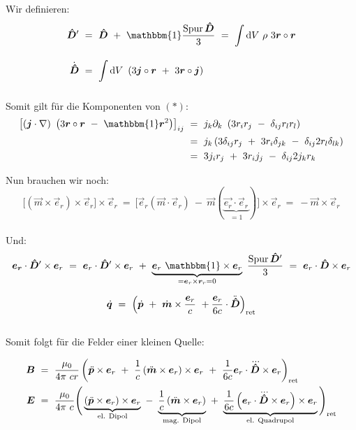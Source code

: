 \newpage
Wir definieren:
\begin{align*}
\tens{D}'  \ &= \ \tens{D} \ + \ \mathbbm{1}\frac{\operatorname{Spur} \tens{D}}{3}  \ = \  \Int{}{}{V}\rho \ 3 \vec{r}\circ\vec{r}\\
\dot{\tens{D}} \ &= \ \Int{}{}{V}\left(3\vec{j}\circ\vec{r} \ + \ 3 \vec{r}\circ\vec{j}\right)
\end{align*}

Somit gilt für die Komponenten von $(*)$:\\

\begin{align*}
\left[\left(\vec{j}\cdot\nabla\right) \ \left(3\vec{r}\circ\vec{r} \ - \ \mathbbm{1} \vec{r}^2\right)\right]_{ij}  \ &= \ j_k \partial_k\ \left(3 r_i r_j \ - \ \delta_{ij} r_l r_l\right)\\
&= \ j_k \left(3\delta_{ij}r_j \ + \ 3r_i\delta_{jk} \ - \ \delta_{ij} 2 r_l \delta_{lk}\right)\\
&= \ 3j_i r_j \ + \ 3 r_i j_j \ - \ \delta_{ij} 2 j_k r_k
\end{align*}

Nun brauchen wir noch:\\

\begin{equation*}
\big[\left(\vec{m}\times\vec{e}_r\right)\times\vec{e}_r\big]\times\vec{e}_r  \ = \ \big[\vec{e}_r(\vec{m}\cdot\vec{e}_r) \ - \ \vec{m}(\underbrace{\vec{e_r}\cdot\vec{e}_r}_{=1})\big] \times \vec{e}_r \ = \ - \vec{m}\times\vec{e}_r
\end{equation*}\\

Und:\\
\begin{equation*}
\vec{e_r}\cdot\tens{D}'\times\vec{e}_r  \ = \ \vec{e}_r \cdot\tens{D}'\times\vec{e}_r \ + \ \underbrace{\vec{e}_r \ \mathbbm{1} \times\vec{e}_r}_{=\vec{e}_r\times\vec{r}_r =0} \ \frac{\operatorname{Spur}\tens{D}'}{3}  \ = \ \vec{e}_r\cdot\tens{D}\times\vec{e}_r
\end{equation*}

\begin{equation*}
\dot{\bm{q}}  \ = \  \left(\dot{\bm{p}} \ + \ \dot{\bm{m}} \times\frac{\bm{e}_r}{c} \ + \frac{\bm{e}_r}{6c}\cdot \ddot{\bm{\hat{
D}}}\right)_{\text{ret}}
\end{equation*}\\

Somit folgt für die Felder einer kleinen Quelle:

\begin{align*}
\vec{B}  \ &= \ \frac{\mu_0}{4\pi \ c r} \left(\ddot{\vec{p}}\times\vec{e}_r \ + \ \frac{1}{c} \left(\ddot{\vec{m}}\times
\vec{e}_r\right) \times\vec{e}_r \ + \ \frac{1}{6c}\vec{e}_r\cdot\dddot{\tens{D}} \times\vec{e}_r\right)_{\text{ret}}\\
\vec{E}  \ &= \ \frac{\mu_0}{4\pi \ c} \Bigg(\underbrace{\left(\ddot{\vec{p}}\times\vec{e}_r\right)\times\vec{e}_r}_{\text{el. Dipol}} \ - \ \underbrace{\frac{1}{c}\left(\ddot{\vec{m}}\times\vec{e}_r\right)}_{\text{mag. Dipol}} \ + \ \underbrace{\frac{1}{6c}\left(\vec{e}_r\cdot\dddot{\tens{D}}\times\vec{e}_r\right)\times\vec{e}_r}_{\text{el. Quadrupol}}\Bigg)_{\text{ret}}
\end{align*}

